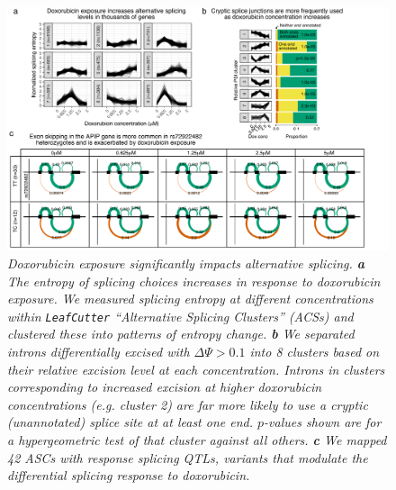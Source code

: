 \documentclass{article}
\begin{document}
\begin{figure}
\begin{center}
    \includegraphics[width=1\textwidth]{../figures/fig3_splicing.pdf}     \caption{\it{Doxorubicin exposure significantly impacts alternative splicing. \textbf{a} The entropy of splicing choices increases in response to doxorubicin exposure. We measured splicing entropy at different concentrations within \texttt{LeafCutter} ``Alternative Splicing Clusters'' (ACSs) and clustered these into patterns of entropy change. \textbf{b} We separated introns differentially excised with $\Delta \Psi > 0.1$ into 8 clusters based on their relative excision level at each concentration. Introns in clusters corresponding to increased excision at higher doxorubicin concentrations (e.g. cluster 2) are far more likely to use a cryptic (unannotated) splice site at at least one end. $p$-values shown are for a hypergeometric test of that cluster against all others. \textbf{c} We mapped 42 ASCs with response splicing QTLs, variants that modulate the differential splicing response to doxorubicin.}}
    \label{fig_splicing}
    \end{center}
\end{figure}
\end{document}
